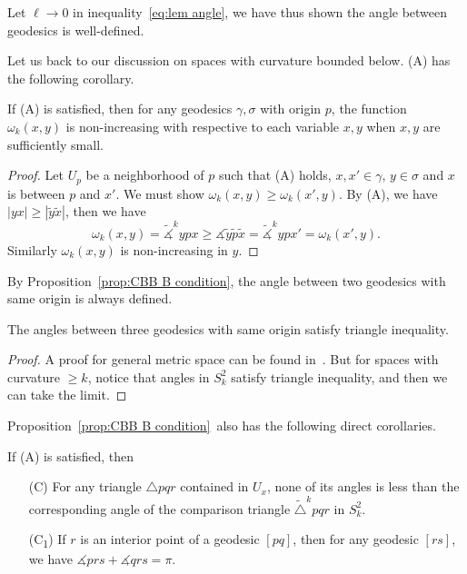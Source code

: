 Let $\ell\to 0$ in inequality~\eqref{eq:lem angle}, we have thus shown the angle between geodesics is well-defined.

Let us back to our discussion on spaces with curvature bounded below.
(A) has the following corollary.
\begin{prop}\label{prop:CBB B condition}
    If (A) is satisfied, then for any geodesics $\gamma,\sigma$ with origin $p$, the function $\omega_k(x,y)$ is non-increasing with respective to each variable $x,y$ when $x,y$ are sufficiently small.
\end{prop}
\begin{proof}
    Let $U_p$ be a neighborhood of $p$ such that (A) holds, $x,x'\in\gamma$, $y\in\sigma$ and $x$ is between $p$ and $x'$.
    We must show $\omega_k(x,y)\geq\omega_k(x',y)$.
    By (A), we have $|yx|\geq|\tilde{y}\tilde{x}|$, then we have
    \[\omega_k(x,y)=\tilde{\measuredangle}^kypx\geq\measuredangle{\tilde{y}\tilde{p}\tilde{x}}=\tilde{\measuredangle}^kypx'=\omega_k(x',y).\]
    Similarly $\omega_k(x,y)$ is non-increasing in $y$.
\end{proof}

By Proposition~\ref{prop:CBB B condition}, the angle between two geodesics with same origin is always defined.

\begin{prop}\label{prop:angle triangle inequality}
    The angles between three geodesics with same origin satisfy triangle inequality.
\end{prop}
\begin{proof}
    A proof for general metric space can be found in~\cite[6.5]{alexanderAlexandrovGeometry2024}.
    But for spaces with curvature $\geq k$, notice that angles in $S^2_k$ satisfy triangle inequality, and then we can take the limit.
\end{proof}

Proposition~\ref{prop:CBB B condition}~also has the following direct corollaries.
\begin{cor}
    If {\rm (A)} is satisfied, then
    \begin{itemize}
        \item[\rm (C)] For any triangle $\triangle{pqr}$ contained in $U_x$, none of its angles is less than the corresponding angle of the comparison triangle $\tilde{\triangle}^kpqr$ in $S^2_k$.
        \item[\rm (C\textsubscript{1})] If $r$ is an interior point of a geodesic $[pq]$, then for any geodesic $[rs]$, we have $\measuredangle{prs}+\measuredangle{qrs}=\pi$. 
    \end{itemize}
\end{cor}

